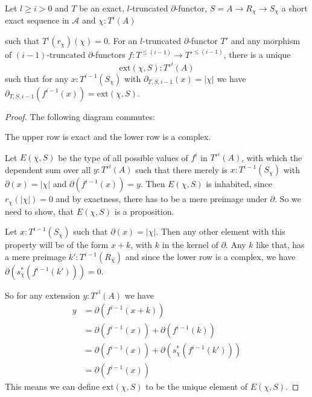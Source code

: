 \begin{lemma}
  \label{lem:extend-map}
  Let $l\geq i>0$ and $T$ be an exact, $l$-truncated $\partial$-functor, $S=A\to R_\chi\to S_\chi$ a short exact sequence in $\mathcal A$
  and $\chi:T^i(A)$
  \begin{center}
  \end{center}
  such that $T^i(r_\chi)(\chi)=0$.
  For an $l$-truncated $\partial$-functor $T'$
  and any morphism of $(i-1)$-truncated $\partial$-functors $f:T^{\leq (i-1)}\to T'^{\leq (i-1)}$, there is a unique
  \[\mathrm{ext}(\chi,S) : T'^i(A)\]
  such that for any $x:T^{i-1}(S_\chi)$ with $\partial_{T,S,i-1}(x)=|\chi|$ we have $\partial_{T,S,i-1}(f^{i-1}(x))=\mathrm{ext}(\chi,S)$.
\end{lemma}

\begin{proof}
  The following diagram commutes:
  \begin{center}
  \end{center}
  The upper row is exact and the lower row is a complex.

  Let $E(\chi,S)$ be the type of all possible values of $f^i$ in $T'^i(A)$,
  with which the dependent sum over all $y:T'^i(A)$ such that there merely is $x:T^{i-1}(S_\chi)$ with $\partial(x)=|\chi|$
  and $\partial(f^{i-1}(x))=y$.
  Then $E(\chi,S)$ is inhabited, since $r_\chi(|\chi|)=0$ and by exactness, there has to be a mere preimage under $\partial$.
  So we need to show, that $E(\chi,S)$ is a proposition.
  
  Let $x:T^{i-1}(S_\chi)$ such that $\partial(x)=|\chi|$.
  Then any other element with this property will be of the form $x+k$, with $k$ in the kernel of $\partial$.
  Any $k$ like that, has a mere preimage $k':T^{i-1}(R_\chi)$ and since the lower row is a complex, we have $\partial(s_\chi^\ast(f^{i-1}(k')))=0$.
  
  So for any extension $y:T'^{i}(A)$ we have
  \begin{align*}
    y &= \partial(f^{i-1}(x+k)) \\
      &= \partial(f^{i-1}(x))+\partial(f^{i-1}(k)) \\
      &= \partial(f^{i-1}(x))+\partial(s_\chi^\ast(f^{i-1}(k'))) \\
      &= \partial(f^{i-1}(x))
  \end{align*}
  This means we can define $\mathrm{ext}(\chi,S)$ to be the unique element of $E(\chi,S)$.
\end{proof}

